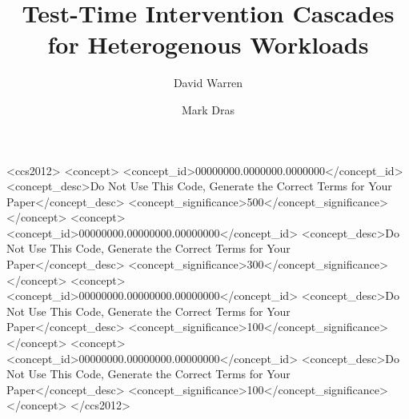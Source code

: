 \documentclass[sigconf]{acmart}
\begin{document}
\title{Test-Time Intervention Cascades for Heterogenous Workloads}

\author{David Warren}
\orcid{\TODO}
\author{Mark Dras}
\correspondingauthor
{}




\renewcommand{\shortauthors}{Warren \& Dras}

\begin{abstract}
  
\end{abstract}

\begin{CCSXML}
\TODO
<ccs2012>
 <concept>
  <concept_id>00000000.0000000.0000000</concept_id>
  <concept_desc>Do Not Use This Code, Generate the Correct Terms for Your Paper</concept_desc>
  <concept_significance>500</concept_significance>
 </concept>
 <concept>
  <concept_id>00000000.00000000.00000000</concept_id>
  <concept_desc>Do Not Use This Code, Generate the Correct Terms for Your Paper</concept_desc>
  <concept_significance>300</concept_significance>
 </concept>
 <concept>
  <concept_id>00000000.00000000.00000000</concept_id>
  <concept_desc>Do Not Use This Code, Generate the Correct Terms for Your Paper</concept_desc>
  <concept_significance>100</concept_significance>
 </concept>
 <concept>
  <concept_id>00000000.00000000.00000000</concept_id>
  <concept_desc>Do Not Use This Code, Generate the Correct Terms for Your Paper</concept_desc>
  <concept_significance>100</concept_significance>
 </concept>
</ccs2012>
\end{CCSXML}
\end{document}
